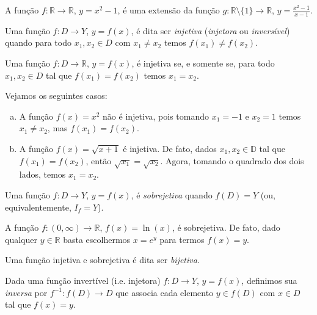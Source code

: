 \begin{ex}
  A função $f:\mathbb{R}\to\mathbb{R}$, $y=x^2-1$, é uma extensão da função $g:\mathbb{R}\setminus\{1\}\to\mathbb{R}$, $\displaystyle y=\frac{x^2-1}{x-1}$.
\end{ex}

\begin{defn}
  Uma função $f:D\to Y$, $y=f(x)$, é dita ser \emph{injetiva} (\emph{injetora} ou \emph{inversível}) quando para todo $x_1, x_2\in D$ com $x_1\neq x_2$ temos $f(x_1)\neq f(x_2)$.
\end{defn}

\begin{obs}
  Uma função $f:D\to\mathbb{R}$, $y=f(x)$, é injetiva se, e somente se, para todo $x_1, x_2\in D$ tal que $f(x_1)=f(x_2)$ temos $x_1=x_2$.
\end{obs}

\begin{ex}
  Vejamos os seguintes casos:
  \begin{enumerate}[a)]
  \item A função $f(x) = x^2$ não é injetiva, pois tomando $x_1=-1$ e $x_2=1$ temos $x_1\neq x_2$, mas $f(x_1)=f(x_2)$.
  \item A função $f(x) = \sqrt{x+1}$ é injetiva. De fato, dados $x_1, x_2\in\mathbb{D}$ tal que $f(x_1)=f(x_2)$, então $\sqrt{x_1} = \sqrt{x_2}$. Agora, tomando o quadrado dos dois lados, temos $x_1 = x_2$.
  \end{enumerate}
\end{ex}

\begin{defn}
  Uma função $f:D\to Y$, $y=f(x)$, é \emph{sobrejetiva} quando $f(D) = Y$ (ou, equivalentemente, $I_f = Y$).
\end{defn}

\begin{ex}
  A função $f:(0, \infty)\to\mathbb{R}$, $f(x) = \ln(x)$, é sobrejetiva. De fato, dado qualquer $y\in\mathbb{R}$ basta escolhermos $x = e^y$ para termos $f(x) = y$.
\end{ex}

\begin{obs}
  Uma função injetiva e sobrejetiva é dita ser \emph{bijetiva}.
\end{obs}

\begin{defn}
  Dada uma função invertível (i.e. injetora) $f:D\to Y$, $y=f(x)$, definimos sua \emph{inversa} por $f^{-1}:f(D)\to D$ que associa cada elemento $y\in f(D)$ com $x\in D$ tal que $f(x) = y$. 
\end{defn}

